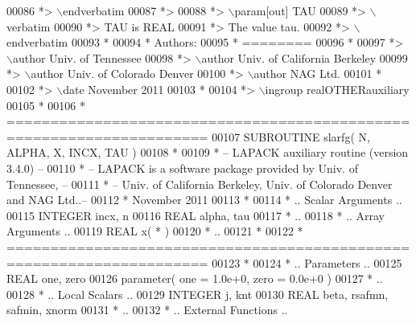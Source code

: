 \begin{DoxyCode}
00086 \textcolor{comment}{*> \(\backslash\)endverbatim}
00087 \textcolor{comment}{*>}
00088 \textcolor{comment}{*> \(\backslash\)param[out] TAU}
00089 \textcolor{comment}{*> \(\backslash\)verbatim}
00090 \textcolor{comment}{*>          TAU is REAL}
00091 \textcolor{comment}{*>          The value tau.}
00092 \textcolor{comment}{*> \(\backslash\)endverbatim}
00093 \textcolor{comment}{*}
00094 \textcolor{comment}{*  Authors:}
00095 \textcolor{comment}{*  ========}
00096 \textcolor{comment}{*}
00097 \textcolor{comment}{*> \(\backslash\)author Univ. of Tennessee }
00098 \textcolor{comment}{*> \(\backslash\)author Univ. of California Berkeley }
00099 \textcolor{comment}{*> \(\backslash\)author Univ. of Colorado Denver }
00100 \textcolor{comment}{*> \(\backslash\)author NAG Ltd. }
00101 \textcolor{comment}{*}
00102 \textcolor{comment}{*> \(\backslash\)date November 2011}
00103 \textcolor{comment}{*}
00104 \textcolor{comment}{*> \(\backslash\)ingroup realOTHERauxiliary}
00105 \textcolor{comment}{*}
00106 \textcolor{comment}{*  =====================================================================}
00107 \textcolor{keyword}{      SUBROUTINE }slarfg( N, ALPHA, X, INCX, TAU )
00108 \textcolor{comment}{*}
00109 \textcolor{comment}{*  -- LAPACK auxiliary routine (version 3.4.0) --}
00110 \textcolor{comment}{*  -- LAPACK is a software package provided by Univ. of Tennessee,    --}
00111 \textcolor{comment}{*  -- Univ. of California Berkeley, Univ. of Colorado Denver and NAG Ltd..--}
00112 \textcolor{comment}{*     November 2011}
00113 \textcolor{comment}{*}
00114 \textcolor{comment}{*     .. Scalar Arguments ..}
00115       \textcolor{keywordtype}{INTEGER}            incx, n
00116       \textcolor{keywordtype}{REAL}               alpha, tau
00117 \textcolor{comment}{*     ..}
00118 \textcolor{comment}{*     .. Array Arguments ..}
00119       \textcolor{keywordtype}{REAL}               x( * )
00120 \textcolor{comment}{*     ..}
00121 \textcolor{comment}{*}
00122 \textcolor{comment}{*  =====================================================================}
00123 \textcolor{comment}{*}
00124 \textcolor{comment}{*     .. Parameters ..}
00125       \textcolor{keywordtype}{REAL}               one, zero
00126       parameter( one = 1.0e+0, zero = 0.0e+0 )
00127 \textcolor{comment}{*     ..}
00128 \textcolor{comment}{*     .. Local Scalars ..}
00129       \textcolor{keywordtype}{INTEGER}            j, knt
00130       \textcolor{keywordtype}{REAL}               beta, rsafmn, safmin, xnorm
00131 \textcolor{comment}{*     ..}
00132 \textcolor{comment}{*     .. External Functions ..}

\end{DoxyCode}
